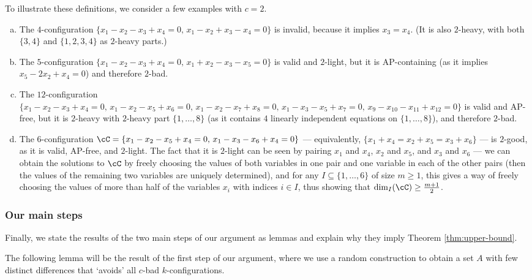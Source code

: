 \begin{example}\label{ex:2-good-illustrate}
    To illustrate these definitions, we consider a few examples with $c = 2$. 
    \begin{enumerate}[(a)]
        \item The $4$-configuration $\{x_1 - x_2 - x_3 + x_4 = 0, \, x_1 - x_2 + x_3 - x_4 = 0\}$ is invalid, because it implies $x_3 = x_4$. (It is also $2$-heavy, with both $\{3, 4\}$ and $\{1, 2, 3, 4\}$ as $2$-heavy parts.) 
        \item The $5$-configuration $\{x_1 - x_2 - x_3 + x_4 = 0, \, x_1 + x_2 - x_3 - x_5 = 0\}$ is valid and $2$-light, but it is AP-containing (as it implies $x_5 - 2x_2 + x_4 = 0$) and therefore $2$-bad. 
        \item The $12$-configuration $\{x_1 - x_2 - x_3 + x_4 = 0, \, x_1 - x_2 - x_5 + x_6 = 0, \, x_1 - x_2 - x_7 + x_8 = 0, \, x_1 - x_3 - x_5 + x_7 = 0, \, x_9 - x_{10} - x_{11} + x_{12} = 0\}$ is valid and AP-free, but it is $2$-heavy with $2$-heavy part $\{1, \ldots, 8\}$ (as it contains $4$ linearly independent equations on $\{1, \ldots, 8\}$), and therefore $2$-bad. 
        \item \label{item:ex-2-good} The $6$-configuration $\cC = \{x_1 - x_2 - x_5 + x_4 = 0, \, x_1 - x_3 - x_6 + x_4 = 0\}$ --- equivalently, $\{x_1 + x_4 = x_2 + x_5 = x_3 + x_6\}$ --- is $2$-good, as it is valid, AP-free, and $2$-light. The fact that it is $2$-light can be seen by pairing $x_1$ and $x_4$, $x_2$ and $x_5$, and $x_3$ and $x_6$ --- we can obtain the solutions to $\cC$ by freely choosing the values of both variables in one pair and one variable in each of the other pairs (then the values of the remaining two variables are uniquely determined), and for any $I \subseteq \{1, \ldots, 6\}$ of size $m \geq 1$, this gives a way of freely choosing the values of more than half of the variables $x_i$ with indices $i \in I$, thus showing that $\dim_I(\cC) \geq \frac{m + 1}{2}$. 
    \end{enumerate}
\end{example}

\subsubsection{Our main steps}

Finally, we state the results of the two main steps of our argument as lemmas and explain why they imply Theorem \ref{thm:upper-bound}. 

The following lemma will be the result of the first step of our argument, where we use a random construction to obtain a set $A$ with few distinct differences that `avoids' all $c$-bad $k$-configurations.

